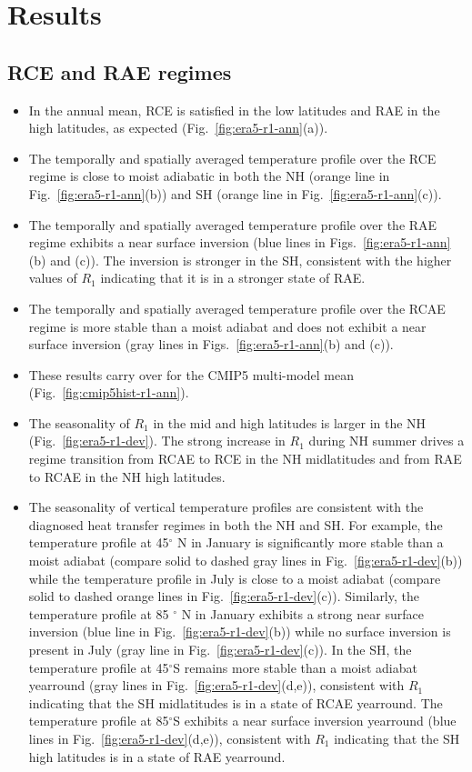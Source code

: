 \documentclass{ametsocV5}
\begin{document}
\section{Results} \label{sec:results}

\subsection{RCE and RAE regimes}
\begin{itemize}
  \item In the annual mean, RCE is satisfied in the low latitudes and RAE in the high latitudes, as expected (Fig.~\ref{fig:era5-r1-ann}(a)).
  \item The temporally and spatially averaged temperature profile over the RCE regime is close to moist adiabatic in both the NH (orange line in Fig.~\ref{fig:era5-r1-ann}(b)) and SH (orange line in Fig.~\ref{fig:era5-r1-ann}(c)).
  \item The temporally and spatially averaged temperature profile over the RAE regime exhibits a near surface inversion (blue lines in Figs.~\ref{fig:era5-r1-ann}(b) and (c)). The inversion is stronger in the SH, consistent with the higher values of $R_{1}$ indicating that it is in a stronger state of RAE.
  \item The temporally and spatially averaged temperature profile over the RCAE regime is more stable than a moist adiabat and does not exhibit a near surface inversion (gray lines in Figs.~\ref{fig:era5-r1-ann}(b) and (c)).
  \item These results carry over for the CMIP5 multi-model mean (Fig.~\ref{fig:cmip5hist-r1-ann}).
  \item The seasonality of \(R_{1}\) in the mid and high latitudes is larger in the NH (Fig.~\ref{fig:era5-r1-dev}). The strong increase in \(R_{1}\) during NH summer drives a regime transition from RCAE to RCE in the NH midlatitudes and from RAE to RCAE in the NH high latitudes.
  \item The seasonality of vertical temperature profiles are consistent with the diagnosed heat transfer regimes in both the NH and SH. For example, the temperature profile at 45$^{\circ}$ N in January is significantly more stable than a moist adiabat (compare solid to dashed gray lines in Fig.~\ref{fig:era5-r1-dev}(b)) while the temperature profile in July is close to a moist adiabat (compare solid to dashed orange lines in Fig.~\ref{fig:era5-r1-dev}(c)). Similarly, the temperature profile at 85 $^{\circ}$ N in January exhibits a strong near surface inversion (blue line in Fig.~\ref{fig:era5-r1-dev}(b)) while no surface inversion is present in July (gray line in Fig.~\ref{fig:era5-r1-dev}(c)). In the SH, the temperature profile at 45$^{\circ}$S remains more stable than a moist adiabat yearround (gray lines in Fig.~\ref{fig:era5-r1-dev}(d,e)), consistent with $R_{1}$ indicating that the SH midlatitudes is in a state of RCAE yearround. The temperature profile at 85$^{\circ}$S exhibits a near surface inversion yearround (blue lines in Fig.~\ref{fig:era5-r1-dev}(d,e)), consistent with $R_{1}$ indicating that the SH high latitudes is in a state of RAE yearround.

\end{itemize}
\end{document}
